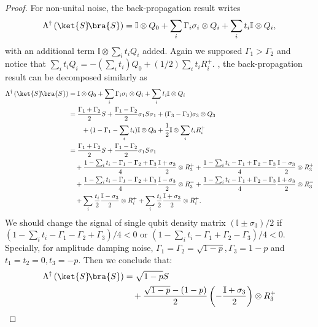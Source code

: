 \documentclass[aps,%
twocolumn,%
floatfix,%
pra,%
amsfonts,%
longbibliography,%
groupedaddress,%
superscriptaddress]{revtex4-2}%
\newcommand{\1}{\mathbbm{1}}
\begin{document}
\begin{proof}
For non-unital noise, the back-propagation result writes 
\begin{align}
    \Lambda^\dagger\left(\ket{S}\!\bra{S}\right) = \mathbb{I} \otimes Q_{0} + \sum_{i } \Gamma_i \sigma_i \otimes Q_i + \sum_i t_i \mathbb{I} \otimes Q_i,
\end{align} 
with an additional term $ \mathbb{I} \otimes \sum_i t_iQ_i$ added.
Again we supposed  $\Gamma_1 > \Gamma_2$ and notice that $\sum_i t_i Q_i = - (\sum_i t_i)Q_0 + (1/2) \sum_i t_i R_i^+$.
, the back-propagation result can be decomposed similarly as
\begin{align}
    \Lambda^\dagger\left(\ket{S}\!\bra{S}\right) &= \mathbb{I} \otimes Q_{0} + \sum_{i } \Gamma_i \sigma_i \otimes Q_i + \sum_i t_i \mathbb{I} \otimes Q_i\\
    &= \frac{\Gamma_1+ \Gamma_2}{2}  S + \frac{\Gamma_1- \Gamma_2}{2} \sigma_1 S \sigma_1 +(\Gamma_3 - \Gamma_2)\sigma_3 \otimes Q_3 \\
    &\quad \quad + (1 - \Gamma_1-\sum_i t_i)\mathbb{I} \otimes Q_0 + \frac{1}{2}\mathbb{I} \otimes \sum_i t_i R_i^+\\
     &= \frac{\Gamma_1+ \Gamma_2}{2}  S + \frac{\Gamma_1- \Gamma_2}{2} \sigma_1 S \sigma_1 \\
    & \quad + \frac{ 1-\sum_i t_i - \Gamma_1- \Gamma_2+\Gamma_3 }{4}\frac{\mathbb{I} + \sigma_3 }{2} \otimes {R_3^+}+\frac{1 -\sum_i t_i- \Gamma_1 + \Gamma_2-\Gamma_3}{4}\frac{\mathbb{I}-\sigma_3}{2} \otimes {R_3^+}\\
    &\quad + \frac{ 1 -\sum_i t_i- \Gamma_1- \Gamma_2+\Gamma_3 }{4}\frac{\mathbb{I} - \sigma_3 }{2} \otimes {R_3^-}+\frac{1 -\sum_i t_i- \Gamma_1 + \Gamma_2-\Gamma_3}{4}\frac{\mathbb{I}+\sigma_3}{2} \otimes {R_3^-}\\
    & \quad +\sum_i\frac{t_i}{2}\frac{\mathbb{I} - \sigma_3}{2}\otimes  R_i^+ +\sum_i\frac{t_i}{2}\frac{\mathbb{I} + \sigma_3}{2}\otimes  R_i^+.
\end{align}
We should change the signal of single qubit density matrix ${(\mathbb{I} \pm \sigma_3) }/{2}$ if ${( 1-\sum_i t_i - \Gamma_1- \Gamma_2+\Gamma_3 )}/{4} <0$ or ${( 1-\sum_i t_i - \Gamma_1+ \Gamma_2-\Gamma_3 )}/{4} <0$.
Specially, for amplitude damping noise, $\Gamma_1 = \Gamma_2 = \sqrt{1 - p}, \Gamma_3 = 1-p$ and $t_1 = t_2 = 0, t_3 = -p$. Then we conclude that:
\begin{align}
    \Lambda^\dagger\left(\ket{S}\!\bra{S}\right) 
     &=  \sqrt{1 - p}  S  \\
    & \quad + \frac{\sqrt{1 - p} -  (1-p) }{2}\left(-\frac{\mathbb{I} + \sigma_3 }{2} \right)\otimes {R_3^+}\\

\end{align}
\end{proof}
\end{document}

